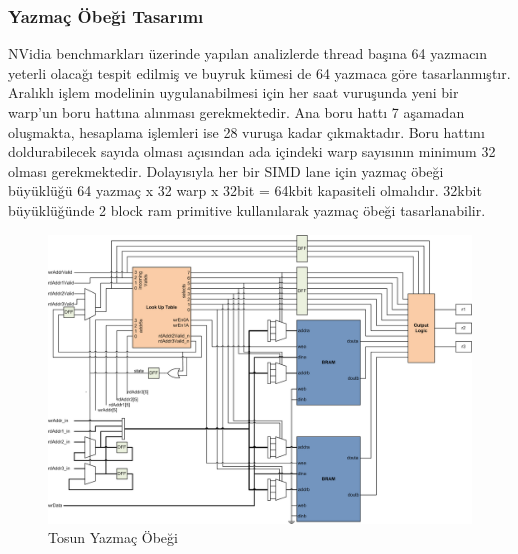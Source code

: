 \subsubsection{Yazmaç Öbeği Tasarımı}
NVidia benchmarkları üzerinde yapılan analizlerde thread başına 64 yazmacın yeterli olacağı tespit edilmiş ve buyruk kümesi de 64 yazmaca göre tasarlanmıştır. Aralıklı işlem modelinin uygulanabilmesi için her saat vuruşunda yeni bir warp'un boru hattına alınması gerekmektedir. Ana boru hattı 7 aşamadan oluşmakta, hesaplama işlemleri ise 28 vuruşa kadar çıkmaktadır. Boru hattını doldurabilecek sayıda olması açısından ada içindeki warp sayısının minimum 32 olması gerekmektedir. Dolayısıyla her bir SIMD lane için yazmaç öbeği büyüklüğü 64 yazmaç x 32 warp x 32bit = 64kbit kapasiteli olmalıdır. 32kbit büyüklüğünde 2 block ram primitive kullanılarak yazmaç öbeği tasarlanabilir.\par
\begin{figure}[h]
\centering
\shorthandoff{=}
\includegraphics[width=\textwidth]{gorsel/registerFile.png}
\shorthandoff{=}
\caption{Tosun Yazmaç Öbeği}
\label{image:registerFile}
\end{figure}
